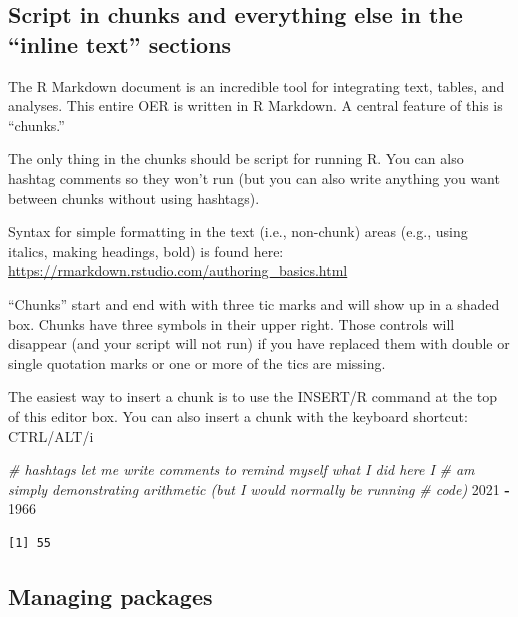 \documentclass[
  11pt,
]{book}
\newenvironment{Shaded}{\begin{snugshade}}{\end{snugshade}}
\newcommand{\CommentTok}[1]{\textcolor[rgb]{0.37,0.37,0.37}{\textit{#1}}}
\newcommand{\DecValTok}[1]{\textcolor[rgb]{0.06,0.06,0.06}{#1}}
\newcommand{\SpecialCharTok}[1]{\textcolor[rgb]{0.43,0.43,0.43}{\textbf{#1}}}
\begin{document}
\hypertarget{script-in-chunks-and-everything-else-in-the-inline-text-sections}{%
\subsection{Script in chunks and everything else in the ``inline text'' sections}\label{script-in-chunks-and-everything-else-in-the-inline-text-sections}}

The R Markdown document is an incredible tool for integrating text, tables, and analyses. This entire OER is written in R Markdown. A central feature of this is ``chunks.''

The only thing in the chunks should be script for running R. You can also hashtag comments so they won't run (but you can also write anything you want between chunks without using hashtags).

Syntax for simple formatting in the text (i.e., non-chunk) areas (e.g., using italics, making headings, bold) is found here: \url{https://rmarkdown.rstudio.com/authoring_basics.html}

``Chunks'' start and end with with three tic marks and will show up in a shaded box. Chunks have three symbols in their upper right. Those controls will disappear (and your script will not run) if you have replaced them with double or single quotation marks or one or more of the tics are missing.

The easiest way to insert a chunk is to use the INSERT/R command at the top of this editor box. You can also insert a chunk with the keyboard shortcut: CTRL/ALT/i

\begin{Shaded}
\begin{Highlighting}[]
\CommentTok{\# hashtags let me write comments to remind myself what I did here I}
\CommentTok{\# am simply demonstrating arithmetic (but I would normally be running}
\CommentTok{\# code)}
\DecValTok{2021} \SpecialCharTok{{-}} \DecValTok{1966}
\end{Highlighting}
\end{Shaded}

\begin{verbatim}
[1] 55
\end{verbatim}

\hypertarget{managing-packages}{%
\subsection{Managing packages}\label{managing-packages}}
\end{document}
